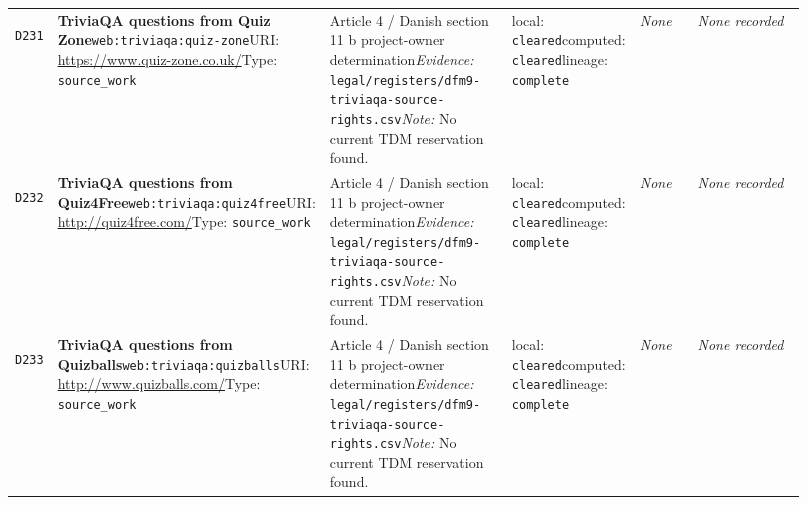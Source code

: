 \documentclass[9pt,a4paper]{article}
\newcommand{\depid}[1]{\hypertarget{dep:#1}{\texttt{#1}}}
\begin{document}
\begin{landscape}
\begin{longtable}{@{}L{0.035\linewidth}L{0.185\linewidth}L{0.27\linewidth}L{0.09\linewidth}L{0.10\linewidth}L{0.24\linewidth}@{}}
\depid{D231} & \textbf{TriviaQA questions from Quiz Zone}\newline \nolinkurl{web:triviaqa:quiz-zone}\newline URI: \url{https://www.quiz-zone.co.uk/}\newline Type: \texttt{source\_work} & Article 4 / Danish section 11 b project-owner determination\newline \textit{Evidence:} \nolinkurl{legal/registers/dfm9-triviaqa-source-rights.csv}\newline \textit{Note:} No current TDM reservation found. & local: \texttt{cleared}\newline computed: \texttt{cleared}\newline lineage: \texttt{complete} & \textit{None} & \textit{None recorded} \\
\depid{D232} & \textbf{TriviaQA questions from Quiz4Free}\newline \nolinkurl{web:triviaqa:quiz4free}\newline URI: \url{http://quiz4free.com/}\newline Type: \texttt{source\_work} & Article 4 / Danish section 11 b project-owner determination\newline \textit{Evidence:} \nolinkurl{legal/registers/dfm9-triviaqa-source-rights.csv}\newline \textit{Note:} No current TDM reservation found. & local: \texttt{cleared}\newline computed: \texttt{cleared}\newline lineage: \texttt{complete} & \textit{None} & \textit{None recorded} \\
\depid{D233} & \textbf{TriviaQA questions from Quizballs}\newline \nolinkurl{web:triviaqa:quizballs}\newline URI: \url{http://www.quizballs.com/}\newline Type: \texttt{source\_work} & Article 4 / Danish section 11 b project-owner determination\newline \textit{Evidence:} \nolinkurl{legal/registers/dfm9-triviaqa-source-rights.csv}\newline \textit{Note:} No current TDM reservation found. & local: \texttt{cleared}\newline computed: \texttt{cleared}\newline lineage: \texttt{complete} & \textit{None} & \textit{None recorded} \\

\end{longtable}
\end{landscape}
\end{document}
